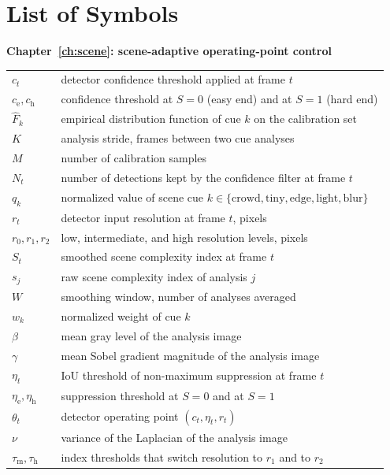 \chapter*{List of Symbols}
\thispagestyle{plain}
\noindent\textbf{Chapter~\ref{ch:scene}: scene-adaptive operating-point control}
\begin{longtable}{@{}p{3.2cm}>{\raggedright\arraybackslash}p{11cm}@{}}
$c_t$ & detector confidence threshold applied at frame $t$ \\
$c_{\mathrm{e}}, c_{\mathrm{h}}$ & confidence threshold at $S=0$ (easy end) and at $S=1$ (hard end) \\
$\hat F_k$ & empirical distribution function of cue $k$ on the calibration set \\
$K$ & analysis stride, frames between two cue analyses \\
$M$ & number of calibration samples \\
$N_{t}$ & number of detections kept by the confidence filter at frame $t$ \\
$q_k$ & normalized value of scene cue $k \in \{\mathrm{crowd}, \mathrm{tiny}, \mathrm{edge}, \mathrm{light}, \mathrm{blur}\}$ \\
$r_t$ & detector input resolution at frame $t$, pixels \\
$r_0, r_1, r_2$ & low, intermediate, and high resolution levels, pixels \\
$S_t$ & smoothed scene complexity index at frame $t$ \\
$s_j$ & raw scene complexity index of analysis $j$ \\
$W$ & smoothing window, number of analyses averaged \\
$w_k$ & normalized weight of cue $k$ \\
$\beta$ & mean gray level of the analysis image \\
$\gamma$ & mean Sobel gradient magnitude of the analysis image \\
$\eta_t$ & IoU threshold of non-maximum suppression at frame $t$ \\
$\eta_{\mathrm{e}}, \eta_{\mathrm{h}}$ & suppression threshold at $S=0$ and at $S=1$ \\
$\theta_t$ & detector operating point $(c_t, \eta_t, r_t)$ \\
$\nu$ & variance of the Laplacian of the analysis image \\
$\tau_{\mathrm{m}}, \tau_{\mathrm{h}}$ & index thresholds that switch resolution to $r_1$ and to $r_2$ \\
\end{longtable}

